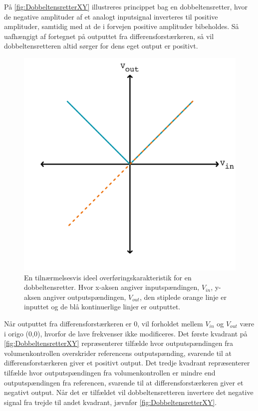 På \autoref{fig:DobbeltensretterXY} illustreres princippet bag en dobbeltensretter, hvor de negative amplituder af et analogt inputsignal inverteres til positive amplituder, samtidig med at de i forvejen positive amplituder bibeholdes. Så uafhængigt af fortegnet på outputtet fra differensforstærkeren, så vil dobbeltensretteren altid sørger for dens eget output er positivt. 
%
\begin{figure}[H]
	\centering
	\includegraphics[resolution=300,scale=\circuitSize]{Figure/Circuits/DobbeltensretterXY.pdf}
	\caption{En tilnærmelsesvis ideel overføringskarakteristik for en dobbeltensretter. Hvor x-aksen angiver inputspændingen, $V_{in}$, y-aksen angiver outputspændingen, $V_{out}$, den stiplede orange linje er inputtet og de blå kontinuerlige linjer er outputtet.}
	\label{fig:DobbeltensretterXY}
\end{figure}
\noindent
%
Når outputtet fra differensforstærkeren er 0, vil forholdet mellem $V_{in}$ og $V_{out}$ være i origo (0,0), hvorfor de lave frekvenser ikke modificeres. Det første kvadrant på \autoref{fig:DobbeltensretterXY} repræsenterer tilfælde hvor outputspændingen fra volumenkontrollen overskrider referencens outputspænding, svarende til at differensforstærkeren giver et positivt output. Det tredje kvadrant repræsenterer tilfælde hvor outputspændingen fra volumenkontrollen er mindre end outputspændingen fra referencen, svarende til at differensforstærkeren giver et negativt output. Når det er tilfældet vil dobbeltensretteren invertere det negative signal fra trejde til andet kvadrant, jævnfør \autoref{fig:DobbeltensretterXY}. 
